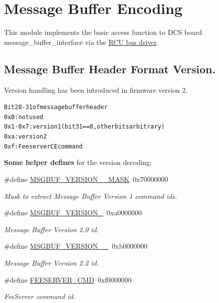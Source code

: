 \hypertarget{group__dcsc__msg__buffer__access}{
\section{Message Buffer Encoding}
\label{group__dcsc__msg__buffer__access}
}
This module implements the basic access function to DCS board message\_\-buffer\_\-interface via the \hyperlink{group__rcubus__driver}{RCU bus driver}.  
\subsection*{Message Buffer Header Format Version.}
Version handling has been introduced in firmware version 2.

\small\begin{alltt}
 Bit 28-31 of message buffer header
 0x0     : not used
 0x1-0x7 : version 1 (bit 31==0, other bits arbitrary)
 0xa     : version 2
 0xf     : Feeserver CE command
 \end{alltt}\normalsize 


{\bf Some helper defines} for the version decoding: \begin{CompactItemize}
\item 
\#define \hyperlink{group__dcsc__msg__buffer__access_gd47e658eba41557f654f0f9284c97317}{MSGBUF\_\-VERSION\_\_\-MASK}~0x70000000
\begin{CompactList}\small\item\em Mask to extract Message Buffer Version 1 command ids. \item\end{CompactList}\item 
\#define \hyperlink{group__dcsc__msg__buffer__access_g4fc7f5db2448d65028809260a6d7879f}{MSGBUF\_\-VERSION\_}~0xa0000000
\begin{CompactList}\small\item\em Message Buffer Version 2.0 id. \item\end{CompactList}\item 
\#define \hyperlink{group__dcsc__msg__buffer__access_gbe9b5c0065d5ca89ab3c3af7723c5340}{MSGBUF\_\-VERSION\_\_}~0xb0000000
\begin{CompactList}\small\item\em Message Buffer Version 2.2 id. \item\end{CompactList}\item 
\#define \hyperlink{group__dcsc__msg__buffer__access_g4922cdfb6125eef890c22cadeb1a4522}{FEESERVER\_\-CMD}~0xf0000000
\begin{CompactList}\small\item\em Fee\-Server command id. \item\end{CompactList}\end{CompactItemize}
